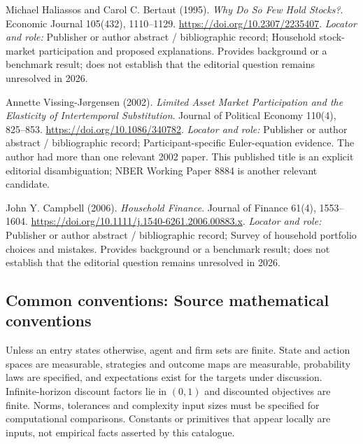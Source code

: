 \documentclass[11pt,a4paper]{article}
\begin{document}
\begin{enumerate}[label={[S\arabic*]},leftmargin=*]

\item Michael Haliassos and Carol C. Bertaut (1995). \emph{Why Do So Few Hold Stocks?}. Economic Journal 105(432), 1110–1129. \url{https://doi.org/10.2307/2235407}.
\textit{Locator and role:} Publisher or author abstract / bibliographic record; Household stock-market participation and proposed explanations. Provides background or a benchmark result; does not establish that the editorial question remains unresolved in 2026.

\item Annette Vissing-Jørgensen (2002). \emph{Limited Asset Market Participation and the Elasticity of Intertemporal Substitution}. Journal of Political Economy 110(4), 825–853. \url{https://doi.org/10.1086/340782}.
\textit{Locator and role:} Publisher or author abstract / bibliographic record; Participant-specific Euler-equation evidence. The author had more than one relevant 2002 paper. This published title is an explicit editorial disambiguation; NBER Working Paper 8884 is another relevant candidate.

\item John Y. Campbell (2006). \emph{Household Finance}. Journal of Finance 61(4), 1553–1604. \url{https://doi.org/10.1111/j.1540-6261.2006.00883.x}.
\textit{Locator and role:} Publisher or author abstract / bibliographic record; Survey of household portfolio choices and mistakes. Provides background or a benchmark result; does not establish that the editorial question remains unresolved in 2026.

\end{enumerate}

\subsection*{Common conventions: Source mathematical conventions}

Unless an entry states otherwise, agent and firm sets are finite. State and action spaces are measurable, strategies and outcome maps are measurable, probability laws are specified, and expectations exist for the targets under discussion. Infinite-horizon discount factors lie in $(0,1)$ and discounted objectives are finite. Norms, tolerances and complexity input sizes must be specified for computational comparisons. Constants or primitives that appear locally are inputs, not empirical facts asserted by this catalogue.
\end{document}
